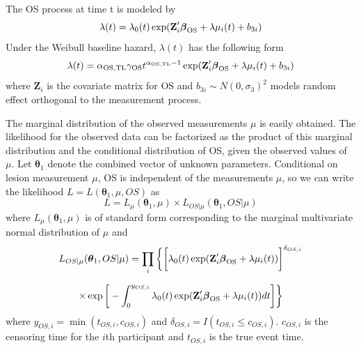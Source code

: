 The \ac{OS} process at time t is modeled by
$$\lambda(t)=\lambda_0(t) \exp(\textbf{Z}_i' \boldsymbol{\beta}_{\rm OS}+\lambda \mu_{i}(t)+b_{3i})$$
Under the Weibull baseline hazard, $\lambda(t)$ has the following form
$$\lambda(t)=\alpha_{\rm OS,TL} \gamma_{\rm OS} t^{\alpha_{\rm OS,TL}-1} \exp(\textbf{Z}_i' \boldsymbol{\beta}_{\rm OS}+\lambda \mu_{i}(t)+b_{3i})$$
where $\textbf{Z}_i$ is the covariate matrix for \ac{OS} and $b_{3i}\sim N(0,{\sigma_3})^2$ models random effect orthogonal to the measurement process. 

The marginal distribution of the observed measurements $\mu$ is easily obtained. The likelihood for the observed data can be factorized as the product of this marginal distribution and the conditional distribution of \ac{OS}, given the observed values of $\mu$. Let $\boldsymbol{\theta}_1$ denote the combined vector of unknown parameters. Conditional on lesion measurement $\mu$, \ac{OS} is independent of the measurements $\mu$, so we can write the likelihood $L=L(\boldsymbol{\theta}_1, \mu, OS)$ as
$$
L=L_{\mu}(\boldsymbol{\theta}_1,\mu)  \times L_{OS| \mu}(\boldsymbol{\theta}_1,OS|\mu)
$$
where $L_{\mu}(\boldsymbol{\theta}_1,\mu)$ is of standard form corresponding to the marginal multivariate normal distribution of $\mu$ and
$$
L_{OS|\mu}(\boldsymbol{\theta}_1, OS|\mu)=\prod_i \bigg\{ \bigg[\lambda_0 (t) \exp(\textbf{Z}_i' \boldsymbol{\beta}_{\rm OS}+\lambda \mu_{i}(t)) \bigg]^{\delta_{OS,i}}
$$

$$
\times \exp \bigg[ -\int_0^{y_{OS,i}} \lambda_0(t) \exp(\textbf{Z}_i' \boldsymbol{\beta}_{\rm OS}+\lambda \mu_{i}(t))dt\bigg]\bigg\}
$$
where $y_{OS,i}=\min(t_{OS,i},c_{OS,i})$ and $\delta_{OS,i}=I(t_{OS,i}\leq c_{OS,i})$. $c_{OS,i}$ is the censoring time for the $i$th participant and $t_{OS,i}$ is the true event time.


%
%
%
%


